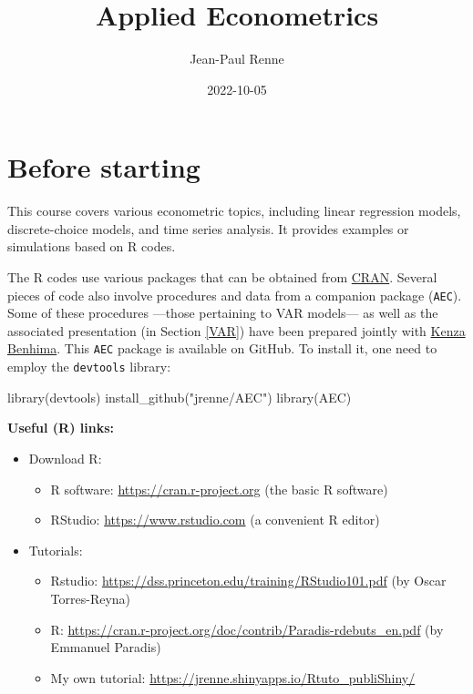 \documentclass[
  12pt,
]{book}
\title{Applied Econometrics}
\author{Jean-Paul Renne}
\date{2022-10-05}
\newenvironment{Shaded}{\begin{snugshade}}{\end{snugshade}}
\newcommand{\FunctionTok}[1]{\textcolor[rgb]{0.00,0.00,0.00}{#1}}
\newcommand{\NormalTok}[1]{#1}
\newcommand{\StringTok}[1]{\textcolor[rgb]{0.31,0.60,0.02}{#1}}
\providecommand{\tightlist}{%
  \setlength{\itemsep}{0pt}\setlength{\parskip}{0pt}}
\theoremstyle{definition}
\theoremstyle{definition}
\theoremstyle{definition}
\theoremstyle{definition}
\theoremstyle{remark}
\begin{document}
\maketitle

{
\setcounter{tocdepth}{1}
\tableofcontents
}
\newcommand{\bv}[1]{\mathbf{#1}}

\hypertarget{intro}{%
\chapter{Before starting}\label{intro}}

This course covers various econometric topics, including linear regression models, discrete-choice models, and time series analysis. It provides examples or simulations based on R codes.

The R codes use various packages that can be obtained from \href{https://cran.r-project.org}{CRAN}. Several pieces of code also involve procedures and data from a companion package (\texttt{AEC}). Some of these procedures ---those pertaining to VAR models--- as well as the associated presentation (in Section \ref{VAR}) have been prepared jointly with \href{https://sites.google.com/site/benhimakenza/}{Kenza Benhima}. This \texttt{AEC} package is available on GitHub. To install it, one need to employ the \texttt{devtools} library:

\begin{Shaded}
\begin{Highlighting}[]
\FunctionTok{library}\NormalTok{(devtools)}
\FunctionTok{install\_github}\NormalTok{(}\StringTok{"jrenne/AEC"}\NormalTok{)}
\FunctionTok{library}\NormalTok{(AEC)}
\end{Highlighting}
\end{Shaded}

\textbf{Useful (R) links:}

\begin{itemize}
\item
  Download R:

  \begin{itemize}
  \tightlist
  \item
    R software: \url{https://cran.r-project.org} (the basic R software)
  \item
    RStudio: \url{https://www.rstudio.com} (a convenient R editor)
  \end{itemize}
\item
  Tutorials:

  \begin{itemize}
  \tightlist
  \item
    Rstudio: \url{https://dss.princeton.edu/training/RStudio101.pdf} (by Oscar Torres-Reyna)
  \item
    R: \url{https://cran.r-project.org/doc/contrib/Paradis-rdebuts_en.pdf} (by Emmanuel Paradis)
  \item
    My own tutorial: \url{https://jrenne.shinyapps.io/Rtuto_publiShiny/}
  \end{itemize}
\end{itemize}
\end{document}
